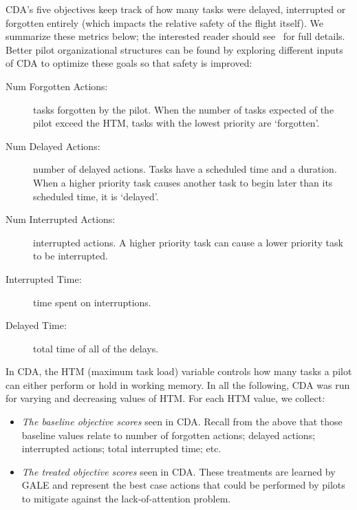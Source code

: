 \documentclass[journal]{IEEEtran}
\newcommand{\bi}{\begin{itemize}}
\newcommand{\ei}{\end{itemize}}
\newcommand{\be}{\begin{enumerate}}
\newcommand{\ee}{\end{enumerate}}
\newenvironment{changed}{\par}{\par}
\begin{document}
CDA's five objectives  keep track of how many tasks were delayed, interrupted or forgotten entirely (which impacts the relative safety of the flight itself).  
We summarize these metrics below; the interested reader should see~\cite{Kim2011} for full details. 
Better pilot organizational structures can be found by exploring different inputs of CDA to optimize these goals so that safety is improved:
\begin{description}
\item[Num Forgotten Actions:] tasks forgotten by the pilot. When the number of tasks expected of the pilot exceed the HTM, tasks with the lowest priority are `forgotten'.
\item[Num Delayed Actions:] number of delayed actions. Tasks have a scheduled time and a duration.  When a higher priority task causes another task to begin later than its scheduled time, it is `delayed'.
\item[Num Interrupted Actions:] interrupted actions. A higher priority task can cause a lower priority task to be interrupted.
\item[Interrupted Time:] time spent on  interruptions.
\item[Delayed Time:] total time of all of the delays.
\end{description}

In CDA, the HTM (maximum task load) variable controls how many tasks a pilot can either perform or hold in working memory.
In all the following, CDA was run for varying and decreasing values of HTM.
For each HTM value, we collect:
\bi
\item {\em The  baseline objective scores} seen in CDA. Recall from the above that those baseline values relate to number of
forgotten actions; delayed actions; interrupted actions;
total interrupted time; etc.
\item {\em The treated objective scores} seen in CDA. These treatments are learned
by GALE and represent the best case actions that could be performed by pilots
to mitigate against the lack-of-attention problem.
\ei
\end{document}
